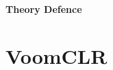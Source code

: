 \documentclass{article} %
\begin{document}
    \begin{center}
        \Large{\textbf{Theory Defence}}
    \end{center}
    \vspace{15pt}

    
    
    
    \section{VoomCLR}
        
        
    
    
    
    \newpage
    
\end{document}
